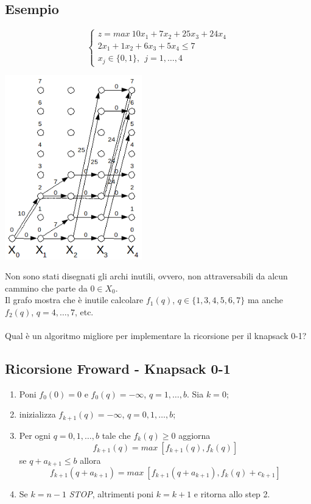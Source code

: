 \subsection{Esempio}
\begin{equation*}
	\begin{cases}
		z=max\ 10x_{1}+7x_{2}+25x_{3}+24x_{4} \\
		2x_{1}+1x_{2}+6x_{3}+5x_{4}\le 7 \\
		x_{j}\in\{0,1\},\ \ j=1,\dots,4
	\end{cases}
\end{equation*}
\centerline{\includegraphics[height=8cm]{images/graph40.png}}
Non sono stati disegnati gli archi inutili, ovvero, non attraversabili da alcun cammino che parte da $0\in X_{0}$.\\
Il grafo mostra che è inutile calcolare $f_{1}(q)$, $q\in\{1,3,4,5,6,7\}$ ma anche $f_{2}(q)$, $q=4,\dots,7$, etc.\\\\
Qual è un algoritmo migliore per implementare la ricorsione per il knapsack 0-1?

\subsection{Ricorsione Froward - Knapsack 0-1}
\begin{enumerate}
	\item Poni $f_{0}(0)=0$ e $f_{0}(q)=-\infty$, $q=1,\dots,b$. Sia $k=0$;
	\item inizializza $f_{k+1}(q)=-\infty$, $q=0,1,\dots,b$;
	\item Per ogni $q=0,1,\dots,b$ tale che $f_{k}(q)\ge 0$ aggiorna 
	\begin{equation}
		f_{k+1}(q)=max\ [f_{k+1}(q),f_{k}(q)] 
	\end{equation}
	se $q+a_{k+1}\le b$ allora
	\begin{equation}
		f_{k+1}(q+a_{k+1})=max\ [f_{k+1}(q+a_{k+1}),f_{k}(q)+c_{k+1}]
	\end{equation}
	\item Se $k=n-1$ \textit{STOP}, altrimenti poni $k=k+1$ e ritorna allo step 2.
\end{enumerate}

